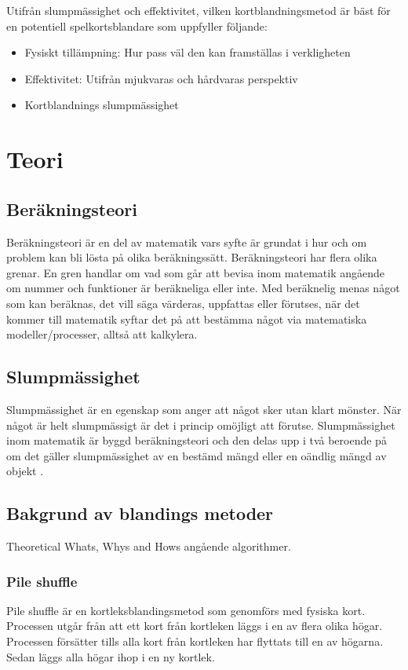 \documentclass[swedish,a4paper]{article}
\begin{document}
Utifrån slumpmässighet och effektivitet, vilken kortblandningsmetod är bäst för
en potentiell spelkortsblandare som uppfyller följande:
\begin{itemize}
	\item Fysiskt tillämpning: Hur pass väl den kan framställas i verkligheten 
	\item Effektivitet: Utifrån mjukvaras och hårdvaras perspektiv
        \item Kortblandnings slumpmässighet
\end{itemize}


\section{Teori}
\subsection{Beräkningsteori}

Beräkningsteori är en del av matematik vars syfte är grundat i hur och om
problem kan bli lösta på olika beräkningssätt. Beräkningsteori har flera olika
grenar. En gren handlar om vad som går att bevisa inom matematik angående om
nummer och funktioner är beräkneliga eller inte. Med beräknelig menas något som
kan beräknas, det vill säga värderas, uppfattas eller förutses, när det kommer
till matematik syftar det på att bestämma något via matematiska
modeller/processer, alltså att kalkylera.

\subsection{Slumpmässighet}

Slumpmässighet är en egenskap som anger att något sker utan klart mönster. När
något är helt slumpmässigt är det i princip omöjligt att förutse. Slumpmässighet
inom matematik är byggd beräknings\-teori och den delas upp i två beroende på om
det gäller slumpmässighet av en bestämd mängd eller en oändlig mängd av objekt
\parencite[49-66]{Terwijn2016}.

\subsection{Bakgrund av blandings metoder}
Theoretical Whats, Whys and Hows angående algorithmer.

\subsubsection{Pile shuffle}
\label{sec:pile_shuffle}
Pile shuffle är en kortleksblandingsmetod som genomförs med fysiska
kort. Processen utgår från att ett kort
från kortleken läggs i en av flera olika högar. Processen försätter
tills alla kort från kortleken har flyttats till en av högarna. Sedan
läggs  alla högar ihop i en ny kortlek. 
\end{document}
